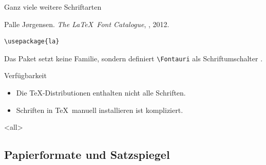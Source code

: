 \begin{Frame}[fragile]{Ganz viele weitere Schriftarten}
  \begin{mybib}
      Palle Jørgensen.
      \newblock \emph{The \LaTeX\ Font Catalogue},
      \newblock {}, 2012.
  \end{mybib}

  \xxx
  \pause

  \begin{Beispiel}
    \begin{lstlisting}[gobble=6,style=block]
      \usepackage{la}
    \end{lstlisting}
    {\Fontauri Das Paket setzt keine Familie, sondern definiert
    \lstinline-\Fontauri- als Schriftumschalter .}
  \end{Beispiel}

  \xxx
  \pause

  \begin{alertblock}{Verfügbarkeit}
    \begin{itemize}
      \item Die \TeX-Distributionen enthalten nicht alle Schriften.
      \item Schriften in \TeX\ manuell installieren ist kompliziert.
    \end{itemize}
  \end{alertblock}
\end{Frame}

\mode
<all>


\malte

\subsection{Papierformate und Satzspiegel}

